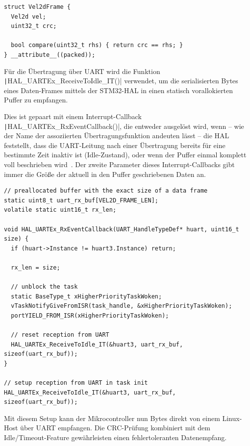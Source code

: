 \begin{code}
\begin{verbatim}
struct Vel2dFrame {
  Vel2d vel;
  uint32_t crc;

  bool compare(uint32_t rhs) { return crc == rhs; }
} __attribute__((packed));
\end{verbatim}
\end{code}

Für die Übertragung über UART wird die Funktion
\texttt|HAL_UARTEx_ReceiveToIdle_IT()| verwendet, um die serialisierten
Bytes eines Daten-Frames mittels der STM32-HAL in einen statisch vorallokierten
Puffer zu empfangen.

Dies ist gepaart mit einem Interrupt-Callback
\texttt|HAL_UARTEx_RxEventCallback()|, die entweder ausgelöst wird,
wenn -- wie der Name der assoziierten Übertragungsfunktion andeuten lässt -- die
HAL feststellt, dass die UART-Leitung nach einer Übertragung bereits für eine
bestimmte Zeit inaktiv ist (Idle-Zustand), oder wenn der Puffer einmal komplett
voll beschrieben wird~\cite{HAL_UARTEx_ReceiveToIdle_IT}. Der zweite Parameter
dieses Interrupt-Callbacks gibt immer die Größe der aktuell in den Puffer
geschriebenen Daten an.

\begin{code}
\begin{verbatim}
// preallocated buffer with the exact size of a data frame
static uint8_t uart_rx_buf[VEL2D_FRAME_LEN];
volatile static uint16_t rx_len;

void HAL_UARTEx_RxEventCallback(UART_HandleTypeDef* huart, uint16_t size) {
  if (huart->Instance != huart3.Instance) return;

  rx_len = size;

  // unblock the task
  static BaseType_t xHigherPriorityTaskWoken;
  vTaskNotifyGiveFromISR(task_handle, &xHigherPriorityTaskWoken);
  portYIELD_FROM_ISR(xHigherPriorityTaskWoken);

  // reset reception from UART
  HAL_UARTEx_ReceiveToIdle_IT(&huart3, uart_rx_buf, sizeof(uart_rx_buf));
}

// setup reception from UART in task init
HAL_UARTEx_ReceiveToIdle_IT(&huart3, uart_rx_buf, sizeof(uart_rx_buf));
\end{verbatim}
    \label{code:uart_isr}
\end{code}

Mit diesem Setup kann der Mikrocontroller nun Bytes direkt von einem Linux-Host
über UART empfangen. Die CRC-Prüfung kombiniert mit dem Idle/Timeout-Feature
gewährleisten einen fehlertoleranten Datenempfang.

